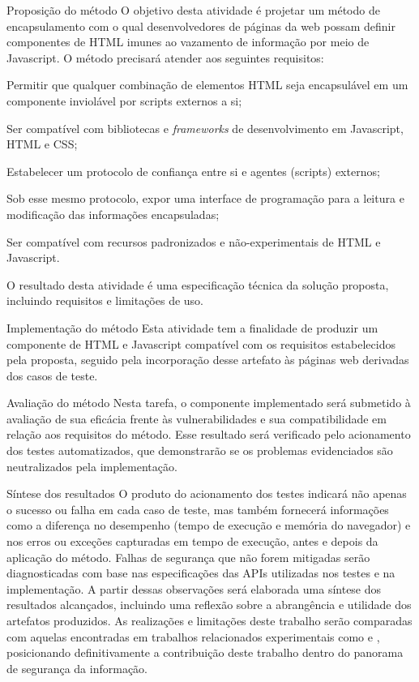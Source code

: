 \begin{alineas}
	\item Proposição do método
	O objetivo desta atividade é projetar um método de encapsulamento com o qual desenvolvedores de páginas da web possam definir componentes de HTML imunes ao vazamento de informação por meio de Javascript. O método precisará atender aos seguintes requisitos:
	
	\begin{alineas}
		\item Permitir que qualquer combinação de elementos HTML seja encapsulável em um componente inviolável por scripts externos a si;
		\item Ser compatível com bibliotecas e \textit{frameworks} de desenvolvimento em Javascript, HTML e CSS;
		\item Estabelecer um protocolo de confiança entre si e agentes (scripts) externos;
		\item Sob esse mesmo protocolo, expor uma interface de programação para a leitura e modificação das informações encapsuladas;
		\item Ser compatível com recursos padronizados e não-experimentais de HTML e Javascript.
	\end{alineas}
	
	O resultado desta atividade é uma especificação técnica da solução proposta, incluindo requisitos e limitações de uso.
	
	\item Implementação do método
	Esta atividade tem a finalidade de produzir um componente de HTML e Javascript compatível com os requisitos estabelecidos pela proposta, seguido pela incorporação desse artefato às páginas web derivadas dos casos de teste.
	
	\item Avaliação do método
	Nesta tarefa, o componente implementado será submetido à avaliação de sua eficácia frente às vulnerabilidades e sua compatibilidade em relação aos requisitos do método. Esse resultado será verificado pelo acionamento dos testes automatizados, que demonstrarão se os problemas evidenciados são neutralizados pela implementação.
	
	\item Síntese dos resultados
	O produto do acionamento dos testes indicará não apenas o sucesso ou falha em cada caso de teste, mas também fornecerá informações como a diferença no desempenho (tempo de execução e memória do navegador) e nos erros ou exceções capturadas em tempo de execução, antes e depois da aplicação do método. Falhas de segurança que não forem mitigadas serão diagnosticadas com base nas especificações das APIs utilizadas nos testes e na implementação. A partir dessas observações será elaborada uma síntese dos resultados alcançados, incluindo uma reflexão sobre a abrangência e utilidade dos artefatos produzidos. As realizações e limitações deste trabalho serão comparadas com aquelas encontradas em trabalhos relacionados experimentais como \cite{Hedin2014} e \cite{Stefan2014}, posicionando definitivamente a contribuição deste trabalho dentro do panorama de segurança da informação.
\end{alineas}
